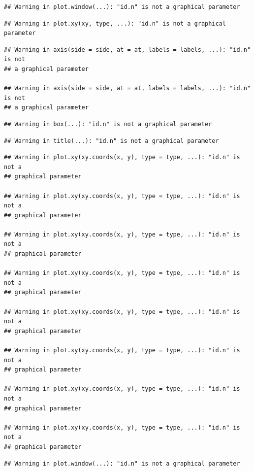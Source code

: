 \documentclass[]{book}
\begin{document}
\begin{verbatim}
## Warning in plot.window(...): "id.n" is not a graphical parameter
\end{verbatim}

\begin{verbatim}
## Warning in plot.xy(xy, type, ...): "id.n" is not a graphical parameter
\end{verbatim}

\begin{verbatim}
## Warning in axis(side = side, at = at, labels = labels, ...): "id.n" is not
## a graphical parameter

## Warning in axis(side = side, at = at, labels = labels, ...): "id.n" is not
## a graphical parameter
\end{verbatim}

\begin{verbatim}
## Warning in box(...): "id.n" is not a graphical parameter
\end{verbatim}

\begin{verbatim}
## Warning in title(...): "id.n" is not a graphical parameter
\end{verbatim}

\begin{verbatim}
## Warning in plot.xy(xy.coords(x, y), type = type, ...): "id.n" is not a
## graphical parameter

## Warning in plot.xy(xy.coords(x, y), type = type, ...): "id.n" is not a
## graphical parameter

## Warning in plot.xy(xy.coords(x, y), type = type, ...): "id.n" is not a
## graphical parameter

## Warning in plot.xy(xy.coords(x, y), type = type, ...): "id.n" is not a
## graphical parameter

## Warning in plot.xy(xy.coords(x, y), type = type, ...): "id.n" is not a
## graphical parameter

## Warning in plot.xy(xy.coords(x, y), type = type, ...): "id.n" is not a
## graphical parameter

## Warning in plot.xy(xy.coords(x, y), type = type, ...): "id.n" is not a
## graphical parameter

## Warning in plot.xy(xy.coords(x, y), type = type, ...): "id.n" is not a
## graphical parameter
\end{verbatim}

\begin{verbatim}
## Warning in plot.window(...): "id.n" is not a graphical parameter
\end{verbatim}
\end{document}
